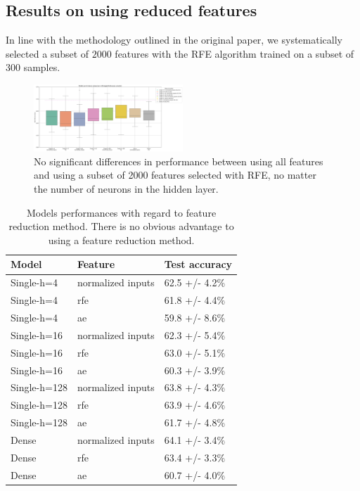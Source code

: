 \subsection{Results on using reduced features}

In line with the methodology outlined in the original paper, we systematically selected a subset of $2000$ features with the RFE algorithm trained on a subset of 300 samples.

\begin{figure}[h!]
    \centering
    \includegraphics[width=0.5\textwidth]{figures/performances_fully_connected_RFE.png}
    \caption{No significant differences in performance between using all features and using a subset of 2000 features selected with RFE, no matter the number of neurons in the hidden layer.}
    \Description{}
    \label{fig:results_feature_reduction}
\end{figure}

\begin{table}[h!]
	\begin{center}
        \begin{tabular}{lll}
            Model & Feature & Test accuracy \\
            \hline
            Single-h=4 & normalized inputs & 62.5 +/- 4.2\% \\
            Single-h=4 & rfe & 61.8 +/- 4.4\% \\
            Single-h=4 & ae & 59.8 +/- 8.6\% \\
            Single-h=16 & normalized inputs & 62.3 +/- 5.4\% \\
            Single-h=16 & rfe & 63.0 +/- 5.1\% \\
            Single-h=16 & ae & 60.3 +/- 3.9\% \\
            Single-h=128 & normalized inputs & 63.8 +/- 4.3\% \\
            Single-h=128 & rfe & 63.9 +/- 4.6\% \\
            Single-h=128 & ae & 61.7 +/- 4.8\% \\
            Dense & normalized inputs & 64.1 +/- 3.4\% \\
            Dense & rfe & 63.4 +/- 3.3\% \\
            Dense & ae & 60.7 +/- 4.0\% \\
        \end{tabular}
    \end{center}
    \caption{Models performances with regard to feature reduction method.
	There is no obvious advantage to using a feature reduction method.}
    \label{table:dependance_on_feature_extraction_method}
\end{table}

